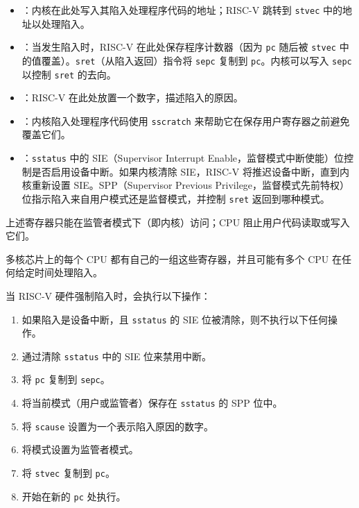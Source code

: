 \begin{itemize}

\item {}：内核在此处写入其陷入处理程序代码的地址；RISC-V 跳转到 {\tt stvec} 中的地址以处理陷入。

\item {}：当发生陷入时，RISC-V 在此处保存程序计数器（因为 {\tt pc} 随后被 {\tt stvec} 中的值覆盖）。{\tt sret}（从陷入返回）指令将 {\tt sepc} 复制到 {\tt pc}。内核可以写入 {\tt sepc} 以控制 {\tt sret} 的去向。

\item {}：RISC-V 在此处放置一个数字，描述陷入的原因。

\item {}：内核陷入处理程序代码使用 {\tt sscratch} 来帮助它在保存用户寄存器之前避免覆盖它们。

\item {}：{\tt sstatus} 中的 SIE（Supervisor Interrupt Enable，监督模式中断使能）位控制是否启用设备中断。如果内核清除 SIE，RISC-V 将推迟设备中断，直到内核重新设置 SIE。SPP（Supervisor Previous Privilege，监督模式先前特权）位指示陷入来自用户模式还是监督模式，并控制 {\tt sret} 返回到哪种模式。

\end{itemize}

上述寄存器只能在监管者模式下（即内核）访问；CPU 阻止用户代码读取或写入它们。

多核芯片上的每个 CPU 都有自己的一组这些寄存器，并且可能有多个 CPU 在任何给定时间处理陷入。

当 RISC-V 硬件强制陷入时，会执行以下操作：

\begin{enumerate}

\item 如果陷入是设备中断，且 {\tt sstatus} 的 SIE 位被清除，则不执行以下任何操作。

\item 通过清除 {\tt sstatus} 中的 SIE 位来禁用中断。

\item 将 {\tt pc} 复制到 {\tt sepc}。

\item 将当前模式（用户或监管者）保存在 {\tt sstatus} 的 SPP 位中。

\item 将 {\tt scause} 设置为一个表示陷入原因的数字。

\item 将模式设置为监管者模式。

\item 将 {\tt stvec} 复制到 {\tt pc}。

\item 开始在新的 {\tt pc} 处执行。

\end{enumerate}

